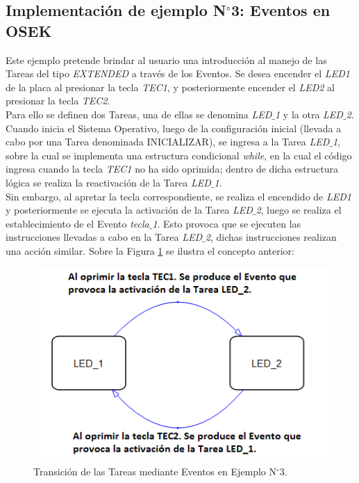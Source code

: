 \documentclass[12pt,letterpaper]{article}
\begin{document}
\subsection{Implementación de ejemplo N$^{\circ}$3: Eventos en OSEK}
Este ejemplo pretende brindar al usuario una introducción al manejo de las Tareas del tipo \textit{EXTENDED} a través de los Eventos. Se desea encender el \textit{LED1} de la placa al presionar la tecla \textit{TEC1}, y posteriormente encender el \textit{LED2} al presionar la tecla \textit{TEC2}.
 \\
 
Para ello se definen dos Tareas, una de ellas se denomina \textit{LED$\_$1} y la otra \textit{LED$\_$2}. Cuando inicia el Sistema Operativo, luego de la configuración inicial (llevada a cabo por una Tarea denominada INICIALIZAR), se ingresa a la Tarea \textit{LED$\_$1}, sobre la cual se implementa una estructura condicional \textit{while}, en la cual el código ingresa cuando la tecla \textit{TEC1} no ha sido oprimida; dentro de dicha estructura lógica se realiza la reactivación de la Tarea \textit{LED$\_$1}.
 \\
 
Sin embargo, al apretar la tecla correspondiente, se realiza el encendido de \textit{LED1} y posteriormente se ejecuta la activación de la Tarea \textit{LED$\_$2}, luego se realiza el establecimiento de el Evento \textit{tecla$\_$1}. Esto provoca que se ejecuten las instrucciones llevadas a cabo en la Tarea \textit{LED$\_$2}, dichas instrucciones realizan una acción similar. Sobre la Figura \ref{ejemplo3} se ilustra el concepto anterior:

\begin{figure}[H]
\centering
\includegraphics[width=10 cm]{figuras/f26.png}
\caption{Transición de las Tareas mediante Eventos en Ejemplo N$^{\circ}$3.}
\label{ejemplo3}
\end{figure}
\end{document}
